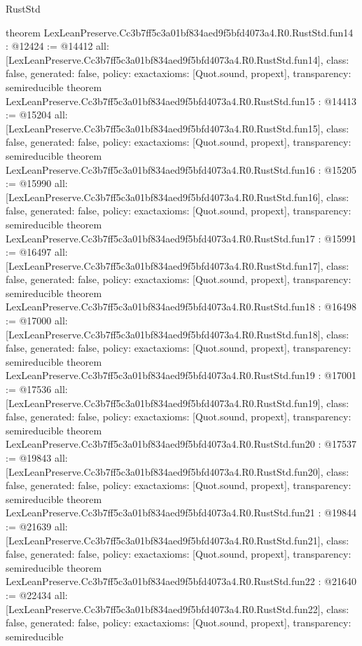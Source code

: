 \begin{lexlean}{RustStd}
\begin{coremodule}
{}
theorem LexLeanPreserve.Cc3b7ff5c3a01bf834aed9f5bfd4073a4.R0.RustStd.fun14 : @12424 := @14412 {
  all: [LexLeanPreserve.Cc3b7ff5c3a01bf834aed9f5bfd4073a4.R0.RustStd.fun14],
  class: false,
  generated: false,
  policy: exact{axioms: [Quot.sound, propext]},
  transparency: semireducible
}
theorem LexLeanPreserve.Cc3b7ff5c3a01bf834aed9f5bfd4073a4.R0.RustStd.fun15 : @14413 := @15204 {
  all: [LexLeanPreserve.Cc3b7ff5c3a01bf834aed9f5bfd4073a4.R0.RustStd.fun15],
  class: false,
  generated: false,
  policy: exact{axioms: [Quot.sound, propext]},
  transparency: semireducible
}
theorem LexLeanPreserve.Cc3b7ff5c3a01bf834aed9f5bfd4073a4.R0.RustStd.fun16 : @15205 := @15990 {
  all: [LexLeanPreserve.Cc3b7ff5c3a01bf834aed9f5bfd4073a4.R0.RustStd.fun16],
  class: false,
  generated: false,
  policy: exact{axioms: [Quot.sound, propext]},
  transparency: semireducible
}
theorem LexLeanPreserve.Cc3b7ff5c3a01bf834aed9f5bfd4073a4.R0.RustStd.fun17 : @15991 := @16497 {
  all: [LexLeanPreserve.Cc3b7ff5c3a01bf834aed9f5bfd4073a4.R0.RustStd.fun17],
  class: false,
  generated: false,
  policy: exact{axioms: [Quot.sound, propext]},
  transparency: semireducible
}
theorem LexLeanPreserve.Cc3b7ff5c3a01bf834aed9f5bfd4073a4.R0.RustStd.fun18 : @16498 := @17000 {
  all: [LexLeanPreserve.Cc3b7ff5c3a01bf834aed9f5bfd4073a4.R0.RustStd.fun18],
  class: false,
  generated: false,
  policy: exact{axioms: [Quot.sound, propext]},
  transparency: semireducible
}
theorem LexLeanPreserve.Cc3b7ff5c3a01bf834aed9f5bfd4073a4.R0.RustStd.fun19 : @17001 := @17536 {
  all: [LexLeanPreserve.Cc3b7ff5c3a01bf834aed9f5bfd4073a4.R0.RustStd.fun19],
  class: false,
  generated: false,
  policy: exact{axioms: [Quot.sound, propext]},
  transparency: semireducible
}
theorem LexLeanPreserve.Cc3b7ff5c3a01bf834aed9f5bfd4073a4.R0.RustStd.fun20 : @17537 := @19843 {
  all: [LexLeanPreserve.Cc3b7ff5c3a01bf834aed9f5bfd4073a4.R0.RustStd.fun20],
  class: false,
  generated: false,
  policy: exact{axioms: [Quot.sound, propext]},
  transparency: semireducible
}
theorem LexLeanPreserve.Cc3b7ff5c3a01bf834aed9f5bfd4073a4.R0.RustStd.fun21 : @19844 := @21639 {
  all: [LexLeanPreserve.Cc3b7ff5c3a01bf834aed9f5bfd4073a4.R0.RustStd.fun21],
  class: false,
  generated: false,
  policy: exact{axioms: [Quot.sound, propext]},
  transparency: semireducible
}
theorem LexLeanPreserve.Cc3b7ff5c3a01bf834aed9f5bfd4073a4.R0.RustStd.fun22 : @21640 := @22434 {
  all: [LexLeanPreserve.Cc3b7ff5c3a01bf834aed9f5bfd4073a4.R0.RustStd.fun22],
  class: false,
  generated: false,
  policy: exact{axioms: [Quot.sound, propext]},
  transparency: semireducible
}
\end{coremodule}
\end{lexlean}
